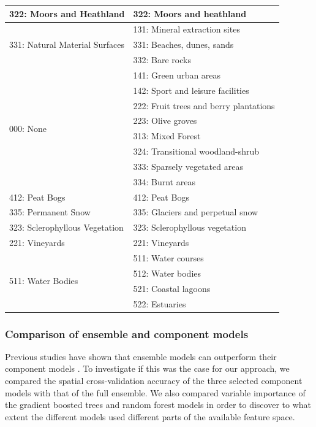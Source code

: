 \begin{table}[!hbt]
{\begin{tabular}{@{}ll@{}}
        322: Moors and Heathland & 322: Moors and heathland \\ \midrule
        \multirow{3}{*}{331: Natural Material Surfaces} & 131: Mineral extraction sites \\
         & 331: Beaches, dunes, sands \\
         & 332: Bare rocks \\ \midrule
        \multirow{8}{*}{000: None} & 141: Green urban areas \\
         & 142: Sport and leisure facilities \\
         & 222: Fruit trees and berry plantations \\
         & 223: Olive groves \\
         & 313: Mixed Forest \\
         & 324: Transitional woodland-shrub \\
         & 333: Sparsely vegetated areas \\
         & 334: Burnt areas \\ \midrule
        412: Peat Bogs & 412: Peat Bogs \\ \midrule
        335: Permanent Snow & 335: Glaciers and perpetual snow \\ \midrule
        323: Sclerophyllous Vegetation & 323: Sclerophyllous vegetation \\ \midrule
        221: Vineyards & 221: Vineyards \\ \midrule
        \multirow{4}{*}{511: Water Bodies} & 511: Water courses \\
         & 512: Water bodies \\
         & 521: Coastal lagoons \\
         & 522: Estuaries \\ \bottomrule
        \end{tabular}%
    }
\end{table}

    
    \subsubsection*{Comparison of ensemble and component models}
        
        Previous studies have shown that ensemble models can outperform their component models \citep{seni2010ensemble,zhang2012ensemble}. To investigate if this was the case for our approach, we compared the spatial cross-validation accuracy of the three selected component models with that of the full ensemble. We also compared variable importance of the gradient boosted trees and random forest models in order to discover to what extent the different models used different parts of the available feature space.
        
